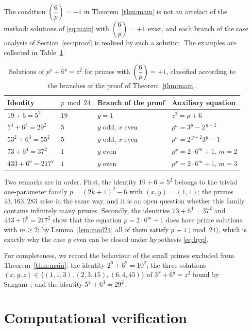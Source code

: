\documentclass[preprint,12pt]{elsarticle}
\theoremstyle{definition}
\newcommand{\leg}[2]{\left(\dfrac{#1}{#2}\right)}
\begin{document}
The condition $\leg{6}{p}=-1$ in Theorem~\ref{thm:main} is not an artefact of
the method: solutions of \eqref{eq:main} with $\leg{6}{p}=+1$ exist, and each
branch of the case analysis of Section~\ref{sec:proof} is realised by such a
solution. The examples are collected in Table~\ref{tab:sharp}.

\begin{table}[htbp]
\centering
\caption{Solutions of $p^{x}+6^{y}=z^{2}$ for primes with $\leg{6}{p}=+1$,
classified according to the branches of the proof of
Theorem~\ref{thm:main}.}\label{tab:sharp}
\begin{tabular}{@{}llll@{}}
\toprule
Identity & $p\bmod 24$ & Branch of the proof & Auxiliary equation \\
\midrule
$19+6=5^{2}$        & $19$ & $y=1$            & $z^{2}=p+6$ \\
$5^{4}+6^{3}=29^{2}$ & $5$  & $y$ odd, $x$ even & $p^{a}=3^{y}-2^{\,y-2}$ \\
$53^{2}+6^{3}=55^{2}$ & $5$ & $y$ odd, $x$ even & $p^{a}=2^{\,y-2}3^{y}-1$ \\
$73+6^{4}=37^{2}$    & $1$  & $y$ even         & $p^{x}=2\cdot 6^{m}+1$, $m=2$ \\
$433+6^{6}=217^{2}$  & $1$  & $y$ even         & $p^{x}=2\cdot 6^{m}+1$, $m=3$ \\
\bottomrule
\end{tabular}
\end{table}

Two remarks are in order. First, the identity $19+6=5^{2}$ belongs to the
trivial one-parameter family $p=(2k+1)^{2}-6$ with $(x,y)=(1,1)$; the primes
$43,163,283$ arise in the same way, and it is an open question whether this
family contains infinitely many primes. Secondly, the identities
$73+6^{4}=37^{2}$ and $433+6^{6}=217^{2}$ show that the equation
$p=2\cdot 6^{m}+1$ does have prime solutions with $m\geq 2$; by
Lemma~\ref{lem:mod24} all of them satisfy $p\equiv 1\pmod{24}$, which is
exactly why the case $y$ even can be closed under hypothesis
\eqref{eq:hyp}.

For completeness, we record the behaviour of the small primes excluded from
Theorem~\ref{thm:main}: the identity $2^{6}+6^{2}=10^{2}$; the three
solutions $(x,y,z)\in\{(1,1,3),(2,3,15),(6,4,45)\}$ of $3^{x}+6^{y}=z^{2}$
found by Sangam~\cite{Sangam2020}; and the identity $5^{4}+6^{3}=29^{2}$.

\section{Computational verification}\label{sec:comp}
\end{document}
